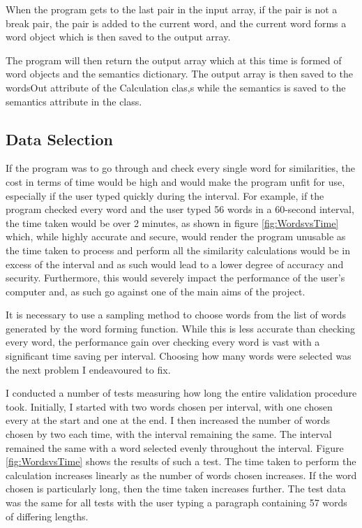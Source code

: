 \documentclass[10pt,a4paper]{report}
\begin{document}
When the program gets to the last pair in the input array, if the pair is not a break pair, the pair is added to the current word, and the current word forms a word object which is then saved to the output array.

The program will then return the output array which at this time is formed of word objects and the semantics dictionary. The output array is then saved to the wordsOut attribute of the Calculation clas,s while the semantics is saved to the semantics attribute in the class.

\subsection{Data Selection}

If the program was to go through and check every single word for similarities, the cost in terms of time would be high and would make the program unfit for use, especially if the user typed quickly during the interval. For example, if the program checked every word and the user typed 56 words in a 60-second interval, the time taken would be over 2 minutes, as shown in figure \ref{fig:WordsvsTime} which, while highly accurate and secure, would render the program unusable as the time taken to process and perform all the similarity calculations would be in excess of the interval and as such would lead to a lower degree of accuracy and security. Furthermore, this would severely impact the performance of the user's computer and, as such go against one of the main aims of the project.

It is necessary to use a sampling method to choose words from the list of words generated by the word forming function. While this is less accurate than checking every word, the performance gain over checking every word is vast with a significant time saving per interval. Choosing how many words were selected was the next problem I endeavoured to fix.

I conducted a number of tests measuring how long the entire validation procedure took. Initially, I started with two words chosen per interval, with one chosen every at the start and one at the end. I then increased the number of words chosen by two each time, with the interval remaining the same. The interval remained the same with a word selected evenly throughout the interval. Figure \ref{fig:WordsvsTime} shows the results of such a test. The time taken to perform the calculation increases linearly as the number of words chosen increases. If the word chosen is particularly long, then the time taken increases further. The test data was the same for all tests with the user typing a paragraph containing 57 words of differing lengths.
\end{document}
